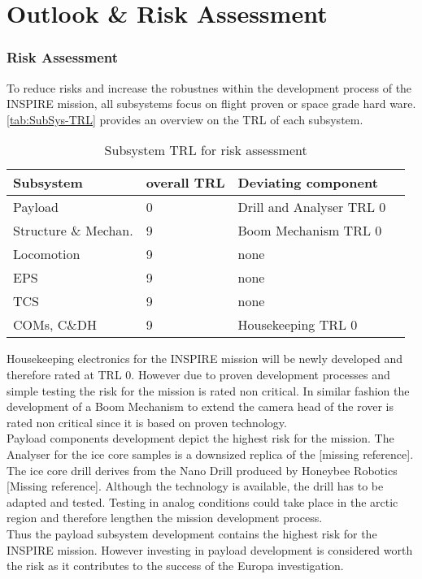 \chapter{Outlook \& Risk Assessment}
\label{chap:outlook}

\subsection{Risk Assessment}

To reduce risks and increase the robustnes within the development process of the INSPIRE mission, all subsystems focus on flight proven or space grade hard ware. \autoref{tab:SubSys-TRL} provides an overview on the TRL of each subsystem. 
 
\begin{table}[h]
\centering
\begin{tabular}{llll}
Subsystem            & overall TRL & Deviating component      &  \\ \hline\hline
Payload              & 0           & Drill and Analyser TRL 0 &  \\
Structure \& Mechan. & 9           & Boom Mechanism TRL 0     &  \\
Locomotion           & 9           & none                     &  \\
EPS                  & 9           & none                     &  \\
TCS                  & 9           & none                     &  \\
COMs, C\&DH          & 9           & Housekeeping TRL 0       & 	 \\ \hline
\end{tabular}
\caption{Subsystem TRL for risk assessment}
\label{tab:SubSys-TRL}
\end{table}

Housekeeping electronics for the INSPIRE mission will be newly developed and therefore rated at TRL 0. However due to proven development processes and simple testing the risk for the mission is rated non critical. 
In similar fashion the development of a Boom Mechanism to extend the camera head of the rover is rated non critical since it is based on proven technology. \\

Payload components development depict the highest risk for the mission. The Analyser for the ice core samples is a downsized replica of the [missing reference]. 
The ice core drill derives from the Nano Drill produced by Honeybee Robotics [Missing reference]. Although the technology is available, the drill has to be adapted and tested. Testing in analog conditions could take place in the arctic region and therefore lengthen the mission development process. \\

Thus the payload subsystem  development contains the highest risk for the INSPIRE mission. However investing in payload development is considered worth the risk as it contributes to the success of the Europa investigation.
